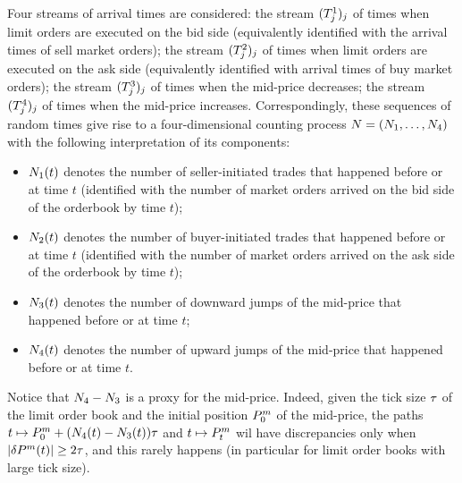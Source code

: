 \documentclass[10pt]{article}
\begin{document}
Four streams of arrival times are considered: the stream $(\arrivalTimes[1]_j)_j$ of times when limit orders are executed on the bid side (equivalently identified with the arrival times of sell market orders); the stream  $(\arrivalTimes[2]_j)_j$ of times when limit orders are executed on the ask side (equivalently identified with arrival times of buy market orders); the stream  $(\arrivalTimes[3]_j)_j$ of times when the mid-price decreases; the stream  $(\arrivalTimes[4]_j)_j$ of times when the mid-price increases. Correspondingly, these sequences of random times give rise to a four-dimensional counting process $\multiCountingProc=(\countingProc[1],\dots, \countingProc[4])$ with the following interpretation of its components:
\begin{itemize}
 \item $\countingProc[1](t)$ denotes the number of seller-initiated trades that happened before or at time $t$ (identified with the number of market orders arrived on the bid side of the orderbook by time $t$);
 \item $\countingProc[2](t)$ denotes the number of buyer-initiated trades that happened before or at time $t$ (identified with the number of market orders arrived on the ask side of the orderbook by time $t$);
 \item $\countingProc[3](t)$ denotes the number of downward jumps of the mid-price  that happened before or at time $t$;
 \item $\countingProc[4](t)$ denotes the number of upward jumps of the mid-price  that happened before or at time $t$.
\end{itemize}

Notice that $\countingProc[4]-\countingProc[3]$ is a proxy for the mid-price. Indeed, given the tick size $\tickSizeOfLOB$ of the limit order book and the initial position $\midprice_0$ of the mid-price,  the paths $t\mapsto \midprice_0 +(\countingProc[4](t)-\countingProc[3](t))\tickSizeOfLOB$ and $t\mapsto \midprice_t$ wil have discrepancies only when $\vert\delta\midprice(t)\vert \geq 2\tickSizeOfLOB$, and this rarely happens (in particular for limit order books with large tick size).
\end{document}
